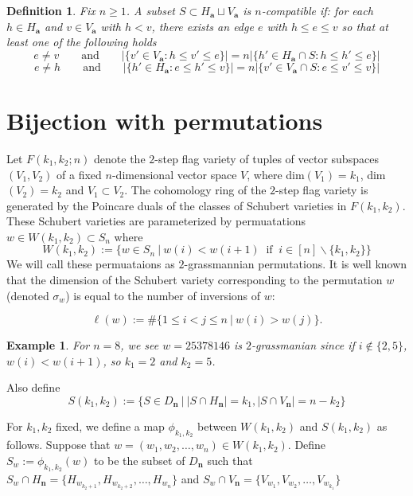 \documentclass{amsart}
\newtheorem{dfn}{Definition}
\newtheorem{ex}{Example}
\newcommand{\bfa}{\mathbf{a}}
\newcommand{\bfn}{\mathbf{n}}
\begin{document}
  \begin{dfn}
    Fix $n\ge1$.
    A subset $S\subset H_\bfa\sqcup V_\bfa$ is \emph{$n$-compatible} if: for each $h\in H_\bfa$ and $v\in V_\bfa$ with $h<v$, there exists an edge $e$ with $h\le e\le v$ so that at least one of the following holds
    \[e\ne v \qquad \text{and} \qquad \big|\{v'\in V_\bfa:h\le v'\le e\}\big|=n\big|\{h'\in H_\bfa\cap S:h\le h'\le e\}\big|\]
    \[e\ne h \qquad \text{and} \qquad \big|\{h'\in H_\bfa:e\le h'\le v\}\big|=n\big|\{v'\in V_\bfa\cap S:e\le v'\le v\}\big|\]
  \end{dfn}

\section{Bijection with permutations}
Let $F(k_1,k_2;n)$ denote the $2$-step flag variety of tuples of vector subspaces $(V_1,V_2)$ of a fixed $n$-dimensional vector space $V$, where dim$(V_1)=k_1$, dim$(V_2)=k_2$ and $V_1\subset V_2$. The cohomology ring of the $2$-step flag variety is generated by the Poincare duals of the classes of Schubert varieties in $F(k_1,k_2)$. These Schubert varieties are parameterized by permuatations $w\in W(k_1,k_2)\subset S_n$ where
\[W(k_1,k_2):=\{w\in S_n \ | \ w(i)<w(i+1) \ \mbox{ if } \ i\in [n]\backslash \{k_1,k_2\}\}\]
We will call these permuataions as $2$-grassmannian permutations.  It is well known that the dimension of the Schubert variety corresponding to the permutation $w$ (denoted $\sigma_w$) is equal to the number of inversions of $w$: 

\[\ell(w):=\#\{1\leq i<j\leq n \ | \ w(i)>w(j)\}.\]

\begin{ex}\label{ex:2step}
For $n=8$, we see $w=25378146$ is $2$-grassmanian since if $i\not\in\{2,5\}$, $w(i)<w(i+1)$, so $k_1=2$ and $k_2=5$. 

\end{ex}

Also define 
\[ S(k_1,k_2):= \{ S\in D_\bfn  \ | \  |S\cap H_\bfn|=k_1, |S\cap V_\bfn|=n-k_2\} \]


For $k_1,k_2$ fixed, we define a map $\phi_{k_1,k_2}$ between $W(k_1,k_2)$ and $S(k_1,k_2)$ as follows. Suppose that $w =(w_1,w_2,\ldots,w_n)  \in W(k_1,k_2)$. Define $S_w:=\phi_{k_1,k_2} (w)$ to be the subset of $D_\bfn$ such that $S_w \cap H_\bfn=\{ H_{w_{k_2 +1}},H_{w_{k_2 +2}}, \ldots, H_{w_n} \}$ and $S_w \cap V_\bfn = \{V_{w_1},V_{w_2},\ldots,V_{w_{k_1}}\}$  
\end{document}
